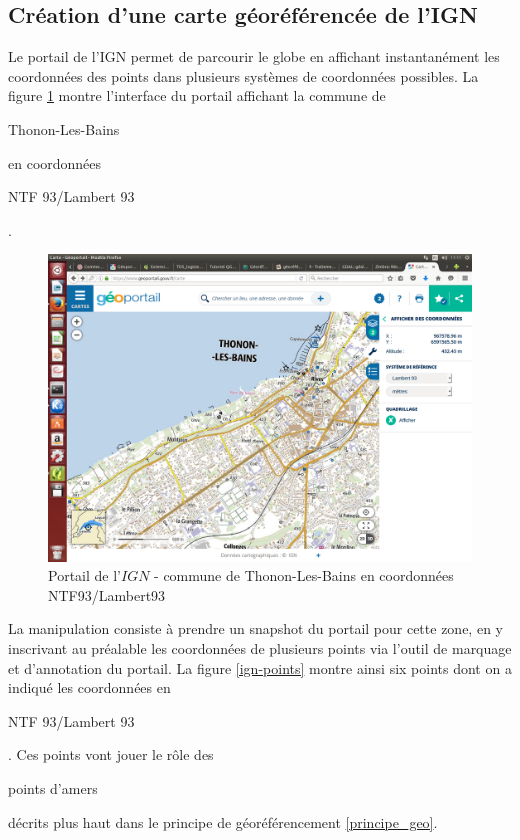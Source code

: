 \documentclass{book}
\begin{document}
\subsection{Création d'une carte géoréférencée de l'IGN}

Le portail de l'IGN \cite{ign-portail} permet de parcourir le globe en affichant instantanément les coordonnées des points dans 
plusieurs systèmes de coordonnées possibles. La figure \ref{ign-portail} montre l'interface du portail affichant la commune de
\begin{itshape}Thonon-Les-Bains\end{itshape} en coordonnées \begin{itshape}NTF 93/Lambert 93\end{itshape}.

\begin{figure}[H]
\begin{center}
\includegraphics[scale=0.3]{images/georeferencing/ign-portail-Thonon.png}
\end{center}
\caption{Portail de l'$IGN$ - commune de Thonon-Les-Bains en coordonnées NTF93/Lambert93 \cite{ign-portail}}
\label{ign-portail}
\end{figure}

La manipulation consiste à prendre un snapshot du portail pour cette zone, en y inscrivant au préalable les coordonnées de 
plusieurs points via l'outil de marquage et d'annotation du portail. La figure \ref{ign-points} montre ainsi six points 
dont on a indiqué les coordonnées en \begin{itshape}NTF 93/Lambert 93\end{itshape}. Ces points vont jouer le rôle des 
\begin{itshape}points d'amers\end{itshape} décrits plus haut dans le principe de géoréférencement \ref{principe_geo}.
\end{document}
